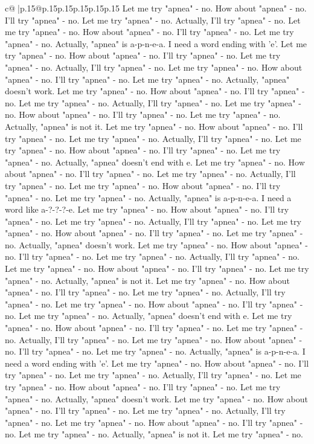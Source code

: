 \documentclass{article}
\begin{document}
{\begin{supertabular}{c@{$\;$}|p{.15\linewidth}@{}p{.15\linewidth}p{.15\linewidth}p{.15\linewidth}p{.15\linewidth}p{.15\linewidth}}
{{{Let me try "apnea" {-} no. How about "apnea" {-} no. I'll try "apnea" {-} no. Let me try "apnea" {-} no. Actually, I'll try "apnea" {-} no. Let me try "apnea" {-} no. How about "apnea" {-} no. I'll try "apnea" {-} no. Let me try "apnea" {-} no. Actually, "apnea" is a{-}p{-}n{-}e{-}a. I need a word ending with 'e'. Let me try "apnea" {-} no. How about "apnea" {-} no. I'll try "apnea" {-} no. Let me try "apnea" {-} no. Actually, I'll try "apnea" {-} no. Let me try "apnea" {-} no. How about "apnea" {-} no. I'll try "apnea" {-} no. Let me try "apnea" {-} no. Actually, "apnea" doesn't work. Let me try "apnea" {-} no. How about "apnea" {-} no. I'll try "apnea" {-} no. Let me try "apnea" {-} no. Actually, I'll try "apnea" {-} no. Let me try "apnea" {-} no. How about "apnea" {-} no. I'll try "apnea" {-} no. Let me try "apnea" {-} no. Actually, "apnea" is not it. Let me try "apnea" {-} no. How about "apnea" {-} no. I'll try "apnea" {-} no. Let me try "apnea" {-} no. Actually, I'll try "apnea" {-} no. Let me try "apnea" {-} no. How about "apnea" {-} no. I'll try "apnea" {-} no. Let me try "apnea" {-} no. Actually, "apnea" doesn't end with e. Let me try "apnea" {-} no. How about "apnea" {-} no. I'll try "apnea" {-} no. Let me try "apnea" {-} no. Actually, I'll try "apnea" {-} no. Let me try "apnea" {-} no. How about "apnea" {-} no. I'll try "apnea" {-} no. Let me try "apnea" {-} no. Actually, "apnea" is a{-}p{-}n{-}e{-}a. I need a word like a{-}?{-}?{-}?{-}e. Let me try "apnea" {-} no. How about "apnea" {-} no. I'll try "apnea" {-} no. Let me try "apnea" {-} no. Actually, I'll try "apnea" {-} no. Let me try "apnea" {-} no. How about "apnea" {-} no. I'll try "apnea" {-} no. Let me try "apnea" {-} no. Actually, "apnea" doesn't work. Let me try "apnea" {-} no. How about "apnea" {-} no. I'll try "apnea" {-} no. Let me try "apnea" {-} no. Actually, I'll try "apnea" {-} no. Let me try "apnea" {-} no. How about "apnea" {-} no. I'll try "apnea" {-} no. Let me try "apnea" {-} no. Actually, "apnea" is not it. Let me try "apnea" {-} no. How about "apnea" {-} no. I'll try "apnea" {-} no. Let me try "apnea" {-} no. Actually, I'll try "apnea" {-} no. Let me try "apnea" {-} no. How about "apnea" {-} no. I'll try "apnea" {-} no. Let me try "apnea" {-} no. Actually, "apnea" doesn't end with e. Let me try "apnea" {-} no. How about "apnea" {-} no. I'll try "apnea" {-} no. Let me try "apnea" {-} no. Actually, I'll try "apnea" {-} no. Let me try "apnea" {-} no. How about "apnea" {-} no. I'll try "apnea" {-} no. Let me try "apnea" {-} no. Actually, "apnea" is a{-}p{-}n{-}e{-}a. I need a word ending with 'e'. Let me try "apnea" {-} no. How about "apnea" {-} no. I'll try "apnea" {-} no. Let me try "apnea" {-} no. Actually, I'll try "apnea" {-} no. Let me try "apnea" {-} no. How about "apnea" {-} no. I'll try "apnea" {-} no. Let me try "apnea" {-} no. Actually, "apnea" doesn't work. Let me try "apnea" {-} no. How about "apnea" {-} no. I'll try "apnea" {-} no. Let me try "apnea" {-} no. Actually, I'll try "apnea" {-} no. Let me try "apnea" {-} no. How about "apnea" {-} no. I'll try "apnea" {-} no. Let me try "apnea" {-} no. Actually, "apnea" is not it. Let me try "apnea" {-} no. }}}
\end{supertabular}}
\end{document}
